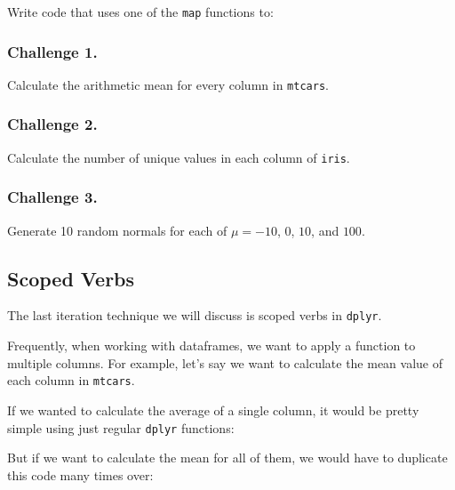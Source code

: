 \documentclass[]{book}
\newenvironment{Shaded}{\begin{snugshade}}{\end{snugshade}}
\newcommand{\KeywordTok}[1]{\textcolor[rgb]{0.13,0.29,0.53}{\textbf{#1}}}
\newcommand{\DataTypeTok}[1]{\textcolor[rgb]{0.13,0.29,0.53}{#1}}
\newcommand{\StringTok}[1]{\textcolor[rgb]{0.31,0.60,0.02}{#1}}
\newcommand{\CommentTok}[1]{\textcolor[rgb]{0.56,0.35,0.01}{\textit{#1}}}
\newcommand{\OperatorTok}[1]{\textcolor[rgb]{0.81,0.36,0.00}{\textbf{#1}}}
\newcommand{\NormalTok}[1]{#1}
\begin{document}
Write code that uses one of the \texttt{map} functions to:

\subsubsection*{Challenge 1.}\label{challenge-1.-14}

Calculate the arithmetic mean for every column in \texttt{mtcars}.

\subsubsection*{Challenge 2.}\label{challenge-2.-13}

Calculate the number of unique values in each column of \texttt{iris}.

\subsubsection*{Challenge 3.}\label{challenge-3.-10}

Generate 10 random normals for each of \(\mu = -10\), \(0\), \(10\), and
\(100\).

\subsection{Scoped Verbs}\label{scoped-verbs}

The last iteration technique we will discuss is scoped verbs in
\texttt{dplyr}.

Frequently, when working with dataframes, we want to apply a function to
multiple columns. For example, let's say we want to calculate the mean
value of each column in \texttt{mtcars}.

If we wanted to calculate the average of a single column, it would be
pretty simple using just regular \texttt{dplyr} functions:

\begin{Shaded}
\end{Shaded}

But if we want to calculate the mean for all of them, we would have to
duplicate this code many times over:
\end{document}

